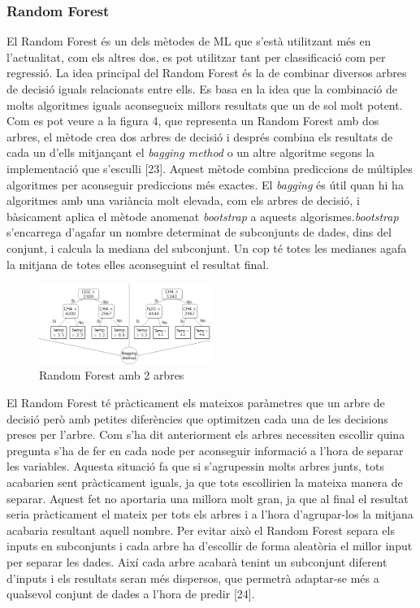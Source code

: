 \documentclass[10pt,a4paper,twocolumn,twoside]{article}
\begin{document}
\subsubsection{Random Forest}
El Random Forest és un dels mètodes de ML que s'està utilitzant més en l'actualitat, com els altres dos, es pot utilitzar tant per classificació com per regressió. La idea principal del Random Forest és la de combinar diversos arbres de decisió iguals relacionats entre ells. Es basa en la idea que la combinació de molts algoritmes iguals aconsegueix millors resultats que un de sol molt potent. Com es pot veure a la figura 4, que representa un Random Forest amb dos arbres, el mètode crea dos arbres de decisió i després combina els resultats de cada un d'ells mitjançant el \textit{bagging method} o un altre algoritme segons la implementació que s'esculli [23]. Aquest mètode combina prediccions de múltiples algoritmes per aconseguir prediccions més exactes. El \textit{bagging} és útil quan hi ha algoritmes amb una variància molt elevada, com els arbres de decisió, i bàsicament aplica el mètode anomenat \textit{bootstrap} a aquests algorismes.\textit{bootstrap} s'encarrega d'agafar un nombre determinat de subconjunts de dades, dins del conjunt, i calcula la mediana del subconjunt. Un cop té totes les medianes agafa la mitjana de totes elles aconseguint el resultat final.
\begin{figure}[!h]
\centering
	\includegraphics[width=0.5\textwidth]{../img/randomForest}
	\caption{Random Forest amb 2 arbres}
	\label{fig-RandomForest}
\end{figure}

El Random Forest té pràcticament els mateixos paràmetres que un arbre de decisió però amb petites diferències que optimitzen cada una de les decisions preses per l'arbre. Com s'ha dit anteriorment els arbres necessiten escollir quina pregunta s'ha de fer en cada node per aconseguir informació a l'hora de separar les variables. Aquesta situació fa que si s'agrupessin molts arbres junts, tots acabarien sent pràcticament iguals, ja que tots escollirien la mateixa manera de separar. Aquest fet no aportaria una millora molt gran, ja que al final el resultat seria pràcticament el mateix per tots els arbres i a l'hora d'agrupar-los la mitjana acabaria resultant aquell nombre. Per evitar això el Random Forest separa els inputs en subconjunts i cada arbre ha d'escollir de forma aleatòria el millor input per separar les dades. Així cada arbre acabarà tenint un subconjunt diferent d'inputs i els resultats seran més dispersos, que permetrà adaptar-se més a qualsevol conjunt de dades a l'hora de predir [24].
\end{document}
